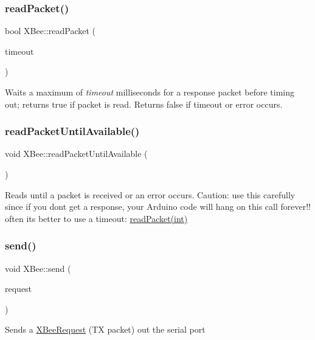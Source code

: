 \subsubsection{\texorpdfstring{read\+Packet()}{readPacket()}\hspace{0.1cm}{\footnotesize\ttfamily [2/2]}}
{\footnotesize\ttfamily bool X\+Bee\+::read\+Packet (\begin{DoxyParamCaption}\item[{int}]{timeout }\end{DoxyParamCaption})}

Waits a maximum of {\itshape timeout} milliseconds for a response packet before timing out; returns true if packet is read. Returns false if timeout or error occurs. \hypertarget{class_x_bee_a594e2bb2ccb7b3fe7a2278b9324b4083}{}\label{class_x_bee_a594e2bb2ccb7b3fe7a2278b9324b4083} 
\subsubsection{\texorpdfstring{read\+Packet\+Until\+Available()}{readPacketUntilAvailable()}}
{\footnotesize\ttfamily void X\+Bee\+::read\+Packet\+Until\+Available (\begin{DoxyParamCaption}{ }\end{DoxyParamCaption})}

Reads until a packet is received or an error occurs. Caution\+: use this carefully since if you don\textquotesingle{}t get a response, your Arduino code will hang on this call forever!! often it\textquotesingle{}s better to use a timeout\+: \hyperlink{class_x_bee_ae1c9f3b53df50564ab9aca2716792b44}{read\+Packet(int)} \hypertarget{class_x_bee_a802387f468be8622941d16739ac848f2}{}\label{class_x_bee_a802387f468be8622941d16739ac848f2} 
\subsubsection{\texorpdfstring{send()}{send()}}
{\footnotesize\ttfamily void X\+Bee\+::send (\begin{DoxyParamCaption}\item[{\hyperlink{class_x_bee_request}{X\+Bee\+Request} \&}]{request }\end{DoxyParamCaption})}

Sends a \hyperlink{class_x_bee_request}{X\+Bee\+Request} (TX packet) out the serial port \hypertarget{class_x_bee_a58ff19e5342060ca91aea247db99b927}{}\label{class_x_bee_a58ff19e5342060ca91aea247db99b927} 
